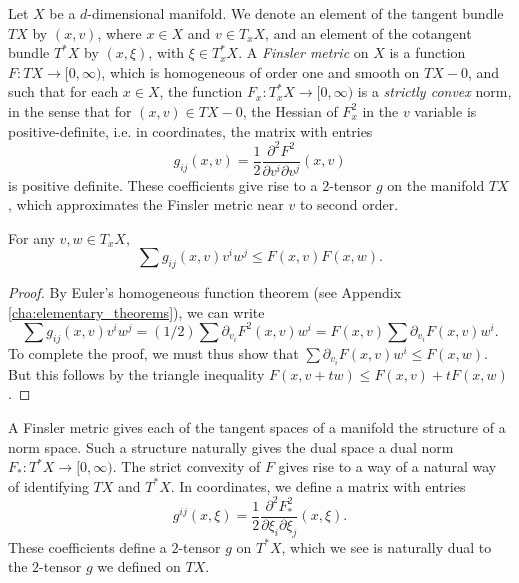 Let $X$ be a $d$-dimensional manifold. We denote an element of the tangent bundle $TX$ by $(x,v)$, where $x \in X$ and $v \in T_x X$, and an element of the cotangent bundle $T^*X$ by $(x,\xi)$, with $\xi \in T_x^* X$. A \emph{Finsler metric} on $X$ is a function $F: T X \to [0,\infty)$, which is homogeneous of order one and smooth on $TX - 0$, and such that for each $x \in X$, the function $F_x: T^*_x X \to [0,\infty)$ is a \emph{strictly convex} norm, in the sense that for $(x,v) \in TX - 0$, the Hessian of $F_x^2$ in the $v$ variable is positive-definite, i.e. in coordinates, the matrix with entries
%
\begin{equation} \label{FinslerMetricCoefficients}
    g_{ij}(x,v) = \frac{1}{2} \frac{\partial^2 F^2}{\partial v^i \partial v^j}(x,v)
\end{equation}
%
is positive definite. These coefficients give rise to a $2$-tensor $g$ on the manifold $T X$, which approximates the Finsler metric near $v$ to second order.

\begin{lemma}
  For any $v,w \in T_x X$,
  \[ \sum g_{ij}(x,v) v^i w^j \leq F(x,v) F(x,w). \]
\end{lemma}
\begin{proof}
  By Euler's homogeneous function theorem (see Appendix \ref{cha:elementary_theorems}), we can write
  \begin{equation}
    \sum g_{ij}(x,v) v^i w^j = (1/2) \sum \partial_{v_i} F^2(x,v) w^i = F(x,v) \sum \partial_{v_i} F(x,v) w^i.
  \end{equation}
  To complete the proof, we must thus show that $\sum \partial_{v_i} F(x,v) w^i \leq F(x,w)$. But this follows by the triangle inequality $F(x,v + tw) \leq F(x,v) + t F(x,w)$.
\end{proof}

A Finsler metric gives each of the tangent spaces of a manifold the structure of a norm space. Such a structure naturally gives the dual space a dual norm $F_*: T^* X \to [0,\infty)$. The strict convexity of $F$ gives rise to a way of a natural way of identifying $TX$ and $T^* X$. In coordinates, we define a matrix with entries
%
\begin{equation}
  g^{ij}(x,\xi) = \frac{1}{2} \frac{\partial^2 F_*^2}{\partial \xi_i \partial \xi_j}(x,\xi).
\end{equation}
%
These coefficients define a $2$-tensor $g$ on $T^* X$, which we see is naturally dual to the $2$-tensor $g$ we defined on $TX$.

